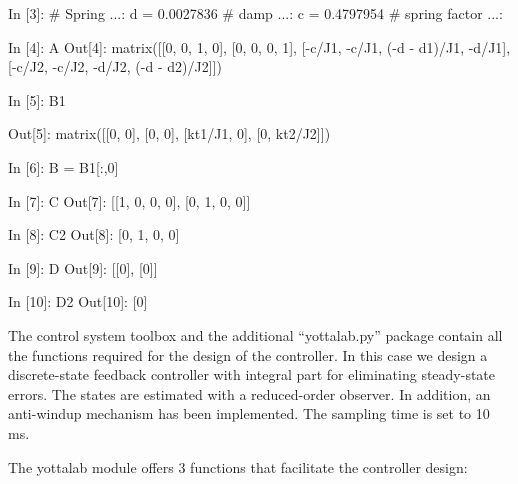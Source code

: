 \begin{code}
In [3]: # Spring         
   ...: d = 0.0027836   # damp
   ...: c = 0.4797954   # spring factor
   ...: 
\end{code}
 
\begin{code}

In [4]: A
Out[4]: 
matrix([[0, 0, 1, 0],
        [0, 0, 0, 1],
        [-c/J1, -c/J1, (-d - d1)/J1, -d/J1],
        [-c/J2, -c/J2, -d/J2, (-d - d2)/J2]])

In [5]: B1

Out[5]: 
matrix([[0, 0],
        [0, 0],
        [kt1/J1, 0],
        [0, kt2/J2]])

In [6]: B = B1[:,0]
        
In [7]: C
Out[7]: [[1, 0, 0, 0], [0, 1, 0, 0]]

In [8]: C2
Out[8]: [0, 1, 0, 0]

In [9]: D
Out[9]: [[0], [0]]

In [10]: D2
Out[10]: [0]
\end{code}

The control system toolbox and the additional ``yottalab.py'' package contain 
all the functions required for the design of the controller. In this case
we design a discrete-state feedback controller with integral part for 
eliminating steady-state errors. The states are estimated with a reduced-order 
observer.
In addition, an anti-windup mechanism has been implemented. The sampling time 
is set to 10 ms.

The yottalab module offers 3 functions that facilitate the controller 
design:

